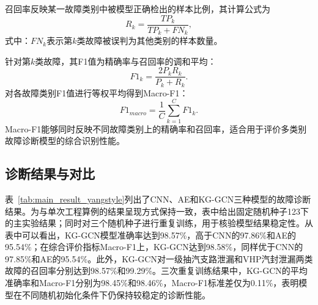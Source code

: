 召回率反映某一故障类别中被模型正确检出的样本比例，其计算公式为
\begin{equation}
R_k=\frac{TP_k}{TP_k+FN_k},
\end{equation}
式中：$FN_k$表示第$k$类故障被误判为其他类别的样本数量。

针对第$k$类故障，其F1值为精确率与召回率的调和平均：
\begin{equation}
F1_k=\frac{2P_kR_k}{P_k+R_k}.
\end{equation}
对各故障类别F1值进行等权平均得到Macro-F1：
\begin{equation}
F1_{macro}=\frac{1}{C}\sum_{k=1}^{C}F1_k.
\end{equation}
Macro-F1能够同时反映不同故障类别上的精确率和召回率，适合用于评价多类别故障诊断模型的综合识别性能。

\subsection{诊断结果与对比}
\label{subsec:results_yangstyle}

表~\ref{tab:main_result_yangstyle}列出了CNN、AE和KG-GCN三种模型的故障诊断结果。为与单次工程算例的结果呈现方式保持一致，表中给出固定随机种子123下的主实验结果；同时对三个随机种子进行重复训练，用于核验模型结果稳定性。从表中可以看出，KG-GCN模型准确率达到98.57\%，高于CNN的97.86\%和AE的95.54\%；在综合评价指标Macro-F1上，KG-GCN达到98.58\%，同样优于CNN的97.85\%和AE的95.54\%。此外，KG-GCN对一级抽汽支路泄漏和VHP汽封泄漏两类故障的召回率分别达到98.57\%和99.29\%。三次重复训练结果中，KG-GCN的平均准确率和Macro-F1分别为98.45\%和98.46\%，Macro-F1标准差仅为0.11\%，表明模型在不同随机初始化条件下仍保持较稳定的诊断性能。

\begin{table}[htbp]
    \centering
    \caption{CNN、AE和KG-GCN算法模型诊断结果对比}
    \label{tab:main_result_yangstyle}
\end{table}

